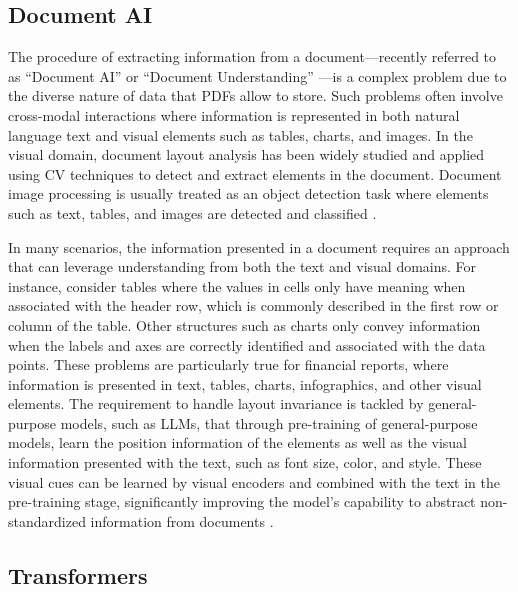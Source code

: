 \documentclass[english, 12pt, a4paper, elec, utf8, a-2b, online]{aaltothesis}
\begin{document}
\subsection{Document AI}

The procedure of extracting information from a document—recently referred to as ``Document AI'' \cite{Cui2021} or ``Document Understanding'' \cite{Nishant2020}—is a complex problem due to the diverse nature of data that \ac{PDF}s allow to store.
Such problems often involve cross-modal interactions where information is represented in both natural language text and visual elements such as tables, charts, and images.
In the visual domain, document layout analysis has been widely studied and applied using \ac{CV} techniques to detect and extract elements in the document.
Document image processing is usually treated as an object detection task where elements such as text, tables, and images are detected and classified \cite{Yang2017, Schreiber2017}.

In many scenarios, the information presented in a document requires an approach that can leverage understanding from both the text and visual domains.
For instance, consider tables where the values in cells only have meaning when associated with the header row, which is commonly described in the first row or column of the table.
Other structures such as charts only convey information when the labels and axes are correctly identified and associated with the data points.
These problems are particularly true for financial reports, where information is presented in text, tables, charts, infographics, and other visual elements.
The requirement to handle layout invariance is tackled by general-purpose models, such as \ac{LLM}s, that through pre-training of general-purpose models, learn the position information of the elements as well as the visual information presented with the text, such as font size, color, and style.
These visual cues can be learned by visual encoders and combined with the text in the pre-training stage, significantly improving the model's capability to abstract non-standardized information from documents \cite{Cui2021}.

\subsection{Transformers}
\end{document}
